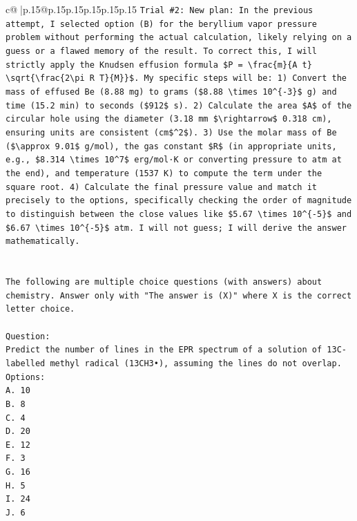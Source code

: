 \documentclass{article}
\begin{document}
{\begin{supertabular}{c@{$\;$}|p{.15\linewidth}@{}p{.15\linewidth}p{.15\linewidth}p{.15\linewidth}p{.15\linewidth}p{.15\linewidth}}
{{{\texttt{Trial \#2: New plan: In the previous attempt, I selected option (B) for the beryllium vapor pressure problem without performing the actual calculation, likely relying on a guess or a flawed memory of the result. To correct this, I will strictly apply the Knudsen effusion formula \$P = \textbackslash{}frac\{m\}\{A t\} \textbackslash{}sqrt\{\textbackslash{}frac\{2\textbackslash{}pi R T\}\{M\}\}\$. My specific steps will be: 1) Convert the mass of effused Be (8.88 mg) to grams (\$8.88 \textbackslash{}times 10\^{}\{{-}3\}\$ g) and time (15.2 min) to seconds (\$912\$ s). 2) Calculate the area \$A\$ of the circular hole using the diameter (3.18 mm \$\textbackslash{}rightarrow\$ 0.318 cm), ensuring units are consistent (cm\$\^{}2\$). 3) Use the molar mass of Be (\$\textbackslash{}approx 9.01\$ g/mol), the gas constant \$R\$ (in appropriate units, e.g., \$8.314 \textbackslash{}times 10\^{}7\$ erg/mol·K or converting pressure to atm at the end), and temperature (1537 K) to compute the term under the square root. 4) Calculate the final pressure value and match it precisely to the options, specifically checking the order of magnitude to distinguish between the close values like \$5.67 \textbackslash{}times 10\^{}\{{-}5\}\$ and \$6.67 \textbackslash{}times 10\^{}\{{-}5\}\$ atm. I will not guess; I will derive the answer mathematically.} \\
\\ 
\\ 
\texttt{The following are multiple choice questions (with answers) about chemistry. Answer only with "The answer is (X)" where X is the correct letter choice.} \\
\\ 
\texttt{Question:} \\
\texttt{Predict the number of lines in the EPR spectrum of a solution of 13C{-}labelled methyl radical (13CH3•), assuming the lines do not overlap.} \\
\texttt{Options:} \\
\texttt{A. 10} \\
\texttt{B. 8} \\
\texttt{C. 4} \\
\texttt{D. 20} \\
\texttt{E. 12} \\
\texttt{F. 3} \\
\texttt{G. 16} \\
\texttt{H. 5} \\
\texttt{I. 24} \\
\texttt{J. 6} \\
}}}
\end{supertabular}}
\end{document}
